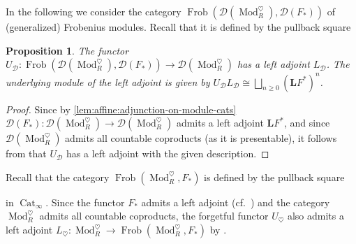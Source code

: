 \documentclass{article}
\theoremstyle{definition}
\theoremstyle{definition}
\theoremstyle{definition}
\theoremstyle{plain}
\theoremstyle{plain}
\theoremstyle{plain}
\theoremstyle{plain}
\theoremstyle{plain}
\theoremstyle{plain}
\newtheorem{prop}[defn]{Proposition}
\theoremstyle{plain}
\theoremstyle{plain}
\theoremstyle{remark}
\theoremstyle{remark}
\theoremstyle{plain}
\theoremstyle{plain}
\theoremstyle{plain}
\theoremstyle{plain}
\theoremstyle{plain}
\newcommand{\id}[1]{\operatorname{id}_{#1}}
\newcommand{\cartsymb}{\arrow[dr, phantom,"\scalebox{1.5}{\color{black}$\lrcorner$}", near start, color=black]}
\newcommand{\ModDisc}[1]{\operatorname{Mod}_{#1}^{\heartsuit}}
\newcommand{\Frob}[2]{\operatorname{Frob}(#1, #2)}
\newcommand{\Cat}[1]{\mathcal{#1}}
\newcommand{\Fun}[2]{\operatorname{Fun}({#1},{#2})}
\newcommand{\CatInf}{\operatorname{Cat}_{\infty}}
\begin{document}
In the following we consider the category $\Frob{\Cat D(\ModDisc{R})}{\Cat D(F_*)}$ of (generalized) Frobenius modules. Recall that it is defined by the pullback square
\begin{center}
\end{center}

\begin{prop} \label{lem:affine:frob-left-adjoint}
    The functor $U_{\Cat D} \colon \Frob{\Cat D(\ModDisc{R})}{\Cat D(F_*)} \to \Cat D(\ModDisc{R})$ has a left adjoint $L_{\Cat D}$.
    The underlying module of the left adjoint is given by $U_{\Cat D}L_{\Cat D} \cong \bigsqcup_{n \ge 0} (\mathbf{L}F^*)^n$.
\end{prop}
\begin{proof}
    Since by \cref{lem:affine:adjunction-on-module-cats} $\Cat D(F_*) \colon \Cat D(\ModDisc{R}) \to \Cat D(\ModDisc{R})$ admits a left adjoint 
    $\mathbf{L}F^*$,
    and since $\Cat D(\ModDisc{R})$ admits all countable coproducts (as it is presentable),
    it follows from \cite[Corollary 4.4]{cartmod} that $U_{\Cat D}$ has a left adjoint with the given description.
\end{proof}

Recall that the category $\Frob{\ModDisc{R}}{F_*}$ is defined by the pullback square
\begin{center}
\end{center}
in $\CatInf$.
Since the functor $F_*$ admits a left adjoint (cf.\ \cite[\href{https://stacks.math.columbia.edu/tag/05DQ}{Tag 05DQ}]{stacks-project}) and the category $\ModDisc{R}$ admits all countable coproducts, the forgetful functor $U_\heartsuit$ also admits a left adjoint $L_\heartsuit\colon \ModDisc{R} \to \Frob{\ModDisc{R}}{F_*}$ by \cite[Corollary 4.4]{cartmod}.
\end{document}
